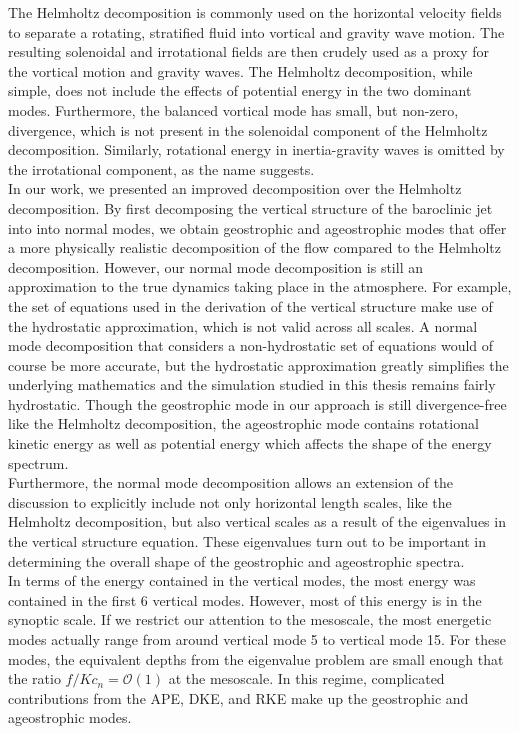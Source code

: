 The Helmholtz decomposition is commonly used on the horizontal velocity fields to separate a rotating, stratified fluid into vortical and gravity wave motion. The resulting solenoidal and irrotational fields are then crudely used as a proxy for the vortical motion and gravity waves. The Helmholtz decomposition, while simple, does not include the effects of potential energy in the two dominant modes. Furthermore, the balanced vortical mode has small, but non-zero, divergence, which is not present in the solenoidal component of the Helmholtz decomposition. Similarly, rotational energy in inertia-gravity waves is omitted by the irrotational component, as the name suggests. \\

In our work, we presented an improved decomposition over the Helmholtz decomposition. By first decomposing the vertical structure of the baroclinic jet into into normal modes, we obtain geostrophic and ageostrophic modes that offer a more physically realistic decomposition of the flow compared to the Helmholtz decomposition. However, our normal mode decomposition is still an approximation to the true dynamics taking place in the atmosphere. For example, the set of equations used in the derivation of the vertical structure make use of the hydrostatic approximation, which is not valid across all scales. A normal mode decomposition that considers a non-hydrostatic set of equations would of course be more accurate, but the hydrostatic approximation greatly simplifies the underlying mathematics and the simulation studied in this thesis remains fairly hydrostatic. Though the geostrophic mode in our approach is still divergence-free like the Helmholtz decomposition, the ageostrophic mode contains rotational kinetic energy as well as potential energy which affects the shape of the energy spectrum.\\

Furthermore, the normal mode decomposition allows an extension of the discussion to explicitly include not only horizontal length scales, like the Helmholtz decomposition, but also vertical scales as a result of the eigenvalues in the vertical structure equation. These eigenvalues turn out to be important in determining the overall shape of the geostrophic and ageostrophic spectra.\\

In terms of the energy contained in the vertical modes, the most energy was contained in the first 6 vertical modes. However, most of this energy is in the synoptic scale. If we restrict our attention to the mesoscale, the most energetic modes actually range from around vertical mode 5 to vertical mode 15. For these modes, the equivalent depths from the eigenvalue problem are small enough that the ratio $f/Kc_n = \mathcal{O}(1)$ at the mesoscale. In this regime, complicated contributions from the APE,  DKE, and RKE make up the geostrophic and ageostrophic modes.\\
 
